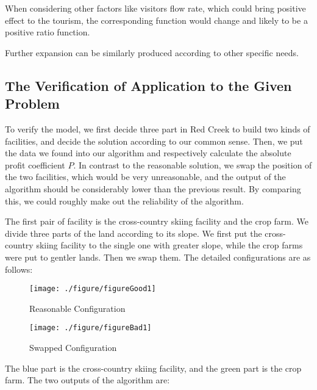 \documentclass[./main.tex]{subfiles}
\begin{document}
    When considering other factors like visitors flow rate, which could bring positive effect to the tourism, the corresponding function would change and likely to be a positive ratio function.

    Further expansion can be similarly produced according to other specific needs.

    \subsection{The Verification of Application to the Given Problem}

    To verify the model, we first decide three part in Red Creek to build two kinds of facilities, and decide the solution according to our common sense.
    Then, we put the data we found into our algorithm and respectively calculate the absolute profit coefficient $P$.
    In contrast to the reasonable solution, we swap the position of the two facilities, which would be very unreasonable, and the output of the algorithm should be considerably lower than the previous result.
    By comparing this, we could roughly make out the reliability of the algorithm.

    The first pair of facility is the cross-country skiing facility and the crop farm.
    We divide three parts of the land according to its slope.
    We first put the cross-country skiing facility to the single one with greater slope, while the crop farms were
    put to gentler lands.
    Then we swap them.
    The detailed configurations are as follows:

    \begin{figure}[H]
        \centering
        \begin{minipage}{0.3\linewidth}
            \centering
            \texttt{[image: ./figure/figureGood1]}
            \caption{Reasonable Configuration}
            \label{fg1}
        \end{minipage}
        \begin{minipage}{0.3\linewidth}
            \centering
            \texttt{[image: ./figure/figureBad1]}
            \caption{Swapped Configuration}
            \label{fb1}
        \end{minipage}
    \end{figure}

    The blue part is the cross-country skiing facility, and the green part is the crop farm.
    The two outputs of the algorithm are:
\end{document}
